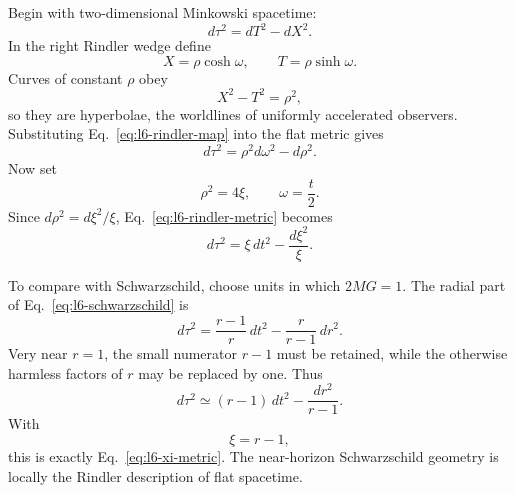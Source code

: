Begin with two-dimensional Minkowski spacetime:
\begin{equation}
d\tau^{2}=dT^{2}-dX^{2}.
\end{equation}
In the right Rindler wedge define
\begin{equation}
X=\rho\cosh\omega,
\qquad
T=\rho\sinh\omega.
\label{eq:l6-rindler-map}
\end{equation}
Curves of constant \(\rho\) obey
\begin{equation}
X^{2}-T^{2}=\rho^{2},
\end{equation}
so they are hyperbolae, the worldlines of uniformly accelerated observers.
Substituting Eq.~\eqref{eq:l6-rindler-map} into the flat metric gives
\begin{equation}
d\tau^{2}
=\rho^{2}d\omega^{2}-d\rho^{2}.
\label{eq:l6-rindler-metric}
\end{equation}
Now set
\begin{equation}
\rho^{2}=4\xi,
\qquad
\omega=\frac{t}{2}.
\label{eq:l6-rindler-rescale}
\end{equation}
Since \(d\rho^{2}=d\xi^{2}/\xi\), Eq.~\eqref{eq:l6-rindler-metric}
becomes
\begin{equation}
d\tau^{2}
=\xi\,dt^{2}-\frac{d\xi^{2}}{\xi}.
\label{eq:l6-xi-metric}
\end{equation}

\begin{classroomqa}
\end{classroomqa}

To compare with Schwarzschild, choose units in which \(2MG=1\).  The radial
part of Eq.~\eqref{eq:l6-schwarzschild} is
\begin{equation}
d\tau^{2}
=
\frac{r-1}{r}\,dt^{2}
-
\frac{r}{r-1}\,dr^{2}.
\end{equation}
Very near \(r=1\), the small numerator \(r-1\) must be retained, while the
otherwise harmless factors of \(r\) may be replaced by one.  Thus
\begin{equation}
d\tau^{2}
\simeq
(r-1)\,dt^{2}
-
\frac{dr^{2}}{r-1}.
\end{equation}
With
\begin{equation}
\xi=r-1,
\end{equation}
this is exactly Eq.~\eqref{eq:l6-xi-metric}.  The near-horizon Schwarzschild
geometry is locally the Rindler description of flat spacetime.

